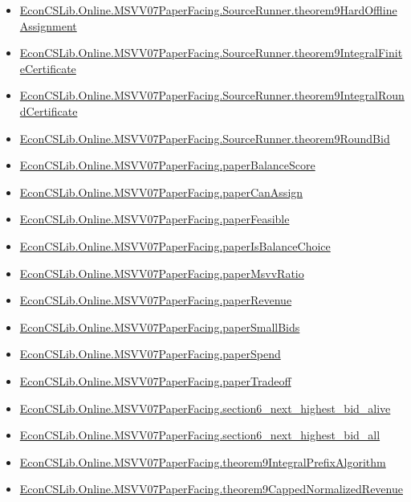 \documentclass[10pt]{article}
\begin{document}
\begin{itemize}[leftmargin=1.2em]
\begin{itemize}[leftmargin=1.2em]
\item \hyperlink{library-prerequisite-a5650acaab19e83f}{EconCSLib.Online.MSVV07PaperFacing.SourceRunner.theorem9HardOfflineAssignment}
\item \hyperlink{library-prerequisite-15f929635d656581}{EconCSLib.Online.MSVV07PaperFacing.SourceRunner.theorem9IntegralFiniteCertificate}
\item \hyperlink{library-prerequisite-a5bd0ccbeac08849}{EconCSLib.Online.MSVV07PaperFacing.SourceRunner.theorem9IntegralRoundCertificate}
\item \hyperlink{library-prerequisite-b56f9b71f34edac7}{EconCSLib.Online.MSVV07PaperFacing.SourceRunner.theorem9RoundBid}
\item \hyperlink{library-prerequisite-75e7afd7f6a95033}{EconCSLib.Online.MSVV07PaperFacing.paperBalanceScore}
\item \hyperlink{library-prerequisite-3a1d98726b70a228}{EconCSLib.Online.MSVV07PaperFacing.paperCanAssign}
\item \hyperlink{library-prerequisite-3a61be4e52466a1e}{EconCSLib.Online.MSVV07PaperFacing.paperFeasible}
\item \hyperlink{library-prerequisite-5237b48bfcea57df}{EconCSLib.Online.MSVV07PaperFacing.paperIsBalanceChoice}
\item \hyperlink{library-prerequisite-28082fc737fb1c54}{EconCSLib.Online.MSVV07PaperFacing.paperMsvvRatio}
\item \hyperlink{library-prerequisite-7a8b8e6b042889db}{EconCSLib.Online.MSVV07PaperFacing.paperRevenue}
\item \hyperlink{library-prerequisite-9b9b77bba06981f4}{EconCSLib.Online.MSVV07PaperFacing.paperSmallBids}
\item \hyperlink{library-prerequisite-e88f47b5baf8433d}{EconCSLib.Online.MSVV07PaperFacing.paperSpend}
\item \hyperlink{library-prerequisite-f42bff7b4d42031e}{EconCSLib.Online.MSVV07PaperFacing.paperTradeoff}
\item \hyperlink{library-prerequisite-13aea6fa728403a9}{EconCSLib.Online.MSVV07PaperFacing.section6\_next\_highest\_bid\_alive}
\item \hyperlink{library-prerequisite-07c9546d3d9e5e08}{EconCSLib.Online.MSVV07PaperFacing.section6\_next\_highest\_bid\_all}
\item \hyperlink{library-prerequisite-9d7fe1e4fce6036c}{EconCSLib.Online.MSVV07PaperFacing.theorem9IntegralPrefixAlgorithm}
\item \hyperlink{library-prerequisite-91429a9932d94ec7}{EconCSLib.Online.MSVV07PaperFacing.theorem9CappedNormalizedRevenue}

\end{itemize}
\end{itemize}
\end{document}
